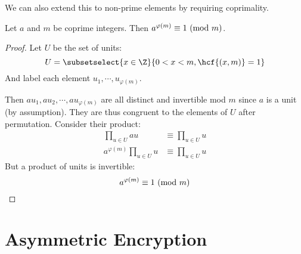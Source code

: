 \documentclass[../Main.tex]{subfiles}
\begin{document}
We can also extend this to non-prime elements by requiring coprimality.
\begin{theorem}
    \label{thmEulerFermat}
    Let $a$ and $m$ be coprime integers. Then $a^{\varphi(m)} \equiv 1~(\text{mod}~{m})$.
\end{theorem}
\begin{proof}
    Let $U$ be the set of units:
    \begin{equation*}
        U = \subsetselect{x \in \Z}{0 < x < m, \hcf{(x, m)} = 1}
    \end{equation*}
    And label each element $u_1, \cdots, u_{\varphi(m)}$.\par
    Then $a u_1, a u_2, \cdots, a u_{\varphi(m)}$ are all distinct and invertible mod $m$ since $a$ is a unit (by assumption). They are thus congruent to the elements of $U$ after permutation. Consider their product:
    \begin{align*}
        \prod_{u \in U} a u &\equiv \prod_{u \in U} u \\
        a^{\varphi(m)} \prod_{u \in U} u &\equiv \prod_{u \in U} u
    \end{align*}
    But a product of units is invertible:
    \begin{equation*}
        a^{\varphi(m)} \equiv 1~(\text{mod}~{m})
    \end{equation*}
\end{proof}
\section{Asymmetric Encryption}
\end{document}
